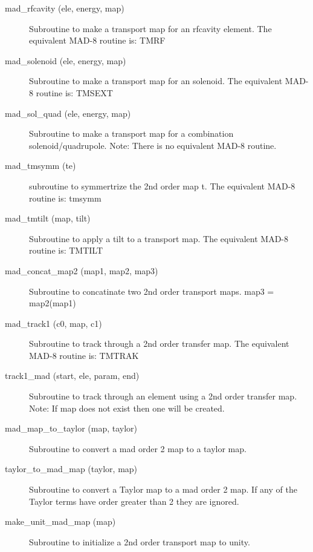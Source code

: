 \begin{description}
\item[mad\_rfcavity (ele, energy, map)] \Newline 
     Subroutine to make a transport map for an rfcavity element.
     The equivalent MAD-8 routine is: TMRF

\item[mad\_solenoid (ele, energy, map)] \Newline 
     Subroutine to make a transport map for an solenoid.
     The equivalent MAD-8 routine is: TMSEXT

\item[mad\_sol\_quad (ele, energy, map)] \Newline 
     Subroutine to make a transport map for a combination solenoid/quadrupole.
     Note: There is no equivalent MAD-8 routine.

\item[mad\_tmsymm (te)] \Newline 
     subroutine to symmertrize the 2nd order map t.
     The equivalent MAD-8 routine is: tmsymm

\item[mad\_tmtilt (map, tilt)] \Newline 
     Subroutine to apply a tilt to a transport map.
     The equivalent MAD-8 routine is: TMTILT

\item[mad\_concat\_map2 (map1, map2, map3)] \Newline 
     Subroutine to concatinate two 2nd order transport maps.
         map3 = map2(map1)

\item[mad\_track1 (c0, map, c1)] \Newline 
     Subroutine to track through a 2nd order transfer map.
     The equivalent MAD-8 routine is: TMTRAK

\item[track1\_mad (start, ele, param, end)] \Newline 
     Subroutine to track through an element using a 2nd order transfer map.
     Note: If map does not exist then one will be created. 

\item[mad\_map\_to\_taylor (map, taylor)] \Newline 
     Subroutine to convert a mad order 2 map to a taylor map.

\item[taylor\_to\_mad\_map (taylor, map)] \Newline 
     Subroutine to convert a Taylor map to a mad order 2 map.
     If any of the Taylor terms have order greater than 2 they are ignored.

\item[make\_unit\_mad\_map (map)] \Newline 
     Subroutine to initialize a 2nd order transport map to unity.


\end{description}

